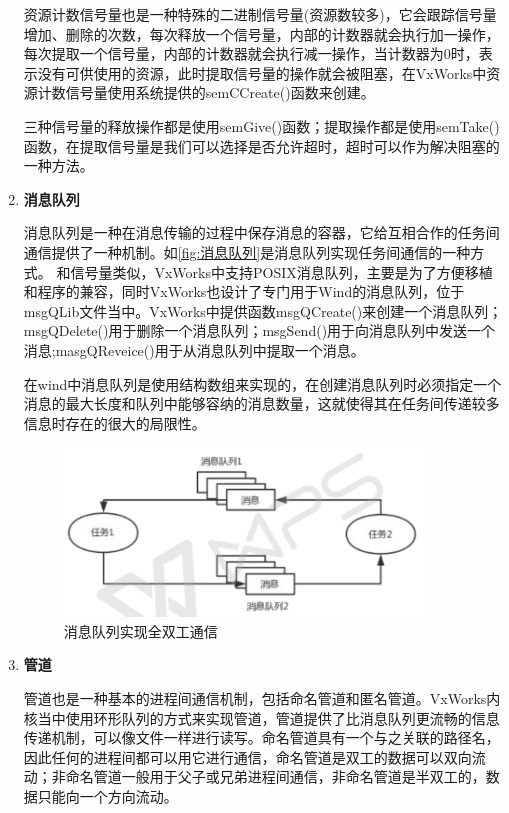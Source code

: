 \begin{enumerate}
	资源计数信号量也是一种特殊的二进制信号量(资源数较多)，它会跟踪信号量增加、删除的次数，每次释放一个信号量，内部的计数器就会执行加一操作，每次提取一个信号量，内部的计数器就会执行减一操作，当计数器为0时，表示没有可供使用的资源，此时提取信号量的操作就会被阻塞，在VxWorks中资源计数信号量使用系统提供的semCCreate()函数来创建。
	
三种信号量的释放操作都是使用semGive()函数；提取操作都是使用semTake()函数，在提取信号量是我们可以选择是否允许超时，超时可以作为解决阻塞的一种方法。

	
	\item \textbf{消息队列}
	
	消息队列是一种在消息传输的过程中保存消息的容器，它给互相合作的任务间通信提供了一种机制。如\autoref{fig:消息队列}是消息队列实现任务间通信的一种方式。
	和信号量类似，VxWorks中支持POSIX消息队列，主要是为了方便移植和程序的兼容，同时VxWorks也设计了专门用于Wind的消息队列，位于msgQLib文件当中。VxWorks中提供函数msgQCreate()来创建一个消息队列；msgQDelete()用于删除一个消息队列；msgSend()用于向消息队列中发送一个消息;masgQReveice()用于从消息队列中提取一个消息。
	
	在wind中消息队列是使用结构数组来实现的，在创建消息队列时必须指定一个消息的最大长度和队列中能够容纳的消息数量，这就使得其在任务间传递较多信息时存在的很大的局限性\cite{冯云贺2014基于}。
	
\begin{figure}[!h]
\centering
\includegraphics[width=0.9\textwidth]{./graphics/messageQueue.pdf}
\caption{消息队列实现全双工通信}\label{fig:消息队列}
\end{figure}	
				
	
	
	\item \textbf{管道}
	
	管道也是一种基本的进程间通信机制，包括命名管道和匿名管道。VxWorks内核当中使用环形队列的方式来实现管道，管道提供了比消息队列更流畅的信息传递机制，可以像文件一样进行读写。命名管道具有一个与之关联的路径名，因此任何的进程间都可以用它进行通信，命名管道是双工的数据可以双向流动；非命名管道一般用于父子或兄弟进程间通信，非命名管道是半双工的，数据只能向一个方向流动。
\end{enumerate}\\		

